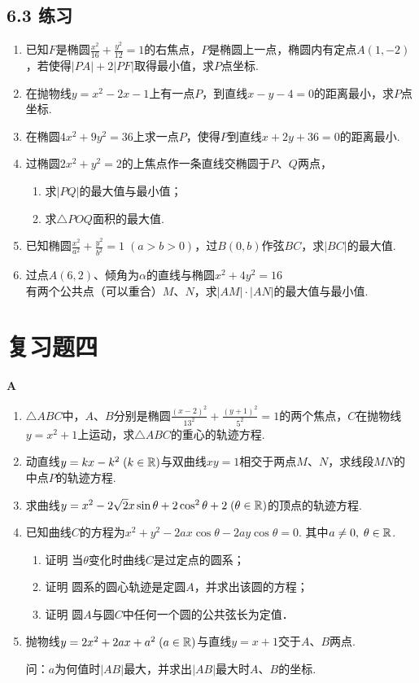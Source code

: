 \subsection*{6.3 练习}
\begin{enumerate}
\item 已知$F$是椭圆$\frac{x^2}{16}+\frac{y^2}{12}=1$的右焦点，$P$是椭圆上一点，椭圆内有定点$A(1,-2)$，若使得$|PA|+2|PF|$取得最小值，求$P$点坐标.
\item 在抛物线$y=x^2-2x-1$上有一点$P$，到直线$x-y-4=0$的距离最小，求$P$点坐标.
\item 在椭圆$4x^2+9y^2=36$上求一点$P$，使得$P$到直线$x+2y+36=0$的距离最小.
\item 过椭圆$2x^2+y^2=2$的上焦点作一条直线交椭圆于$P$、$Q$两点，
\begin{enumerate}[(1)]
    \item 求$|PQ|$的最大值与最小值；
    \item 求$\triangle POQ$面积的最大值.
\end{enumerate}
\item 已知椭圆$\frac{x^2}{a^2}+\frac{y^2}{b^2}=1\; (a>b>0)$，过$B(0,b)$作弦$BC$，求$|BC|$的最大值.
\item 过点$A(6,2)$、倾角为$\alpha$的直线与椭圆$x^2+4y^2=16$有两个公共点（可以重合）$M$、$N$，求$|AM|\cdot |AN|$的最大值与最小值.
\end{enumerate}

\section*{复习题四}
\begin{center}
    \bfseries A
\end{center}

\begin{enumerate}
\item $\triangle ABC$中，$A$、$B$分别是椭圆$\frac{(x-2)^2}{13^2}+\frac{(y+1)^2}{5^2}=1$的两个焦点，$C$在抛物线$y=x^2+1$上运动，求$\triangle ABC$的重心的轨迹方程.
\item 动直线$y=kx-k^2\; (k\in\mathbb{R})$与双曲线$xy=1$相交于两点$M$、$N$，求线段$MN$的中点$P$的轨迹方程.
\item 求曲线$y=x^2-2\sqrt{2}x\sin\theta+2\cos^2\theta+2\; (\theta\in\mathbb{R})$的顶点的轨迹方程.
\item 已知曲线$C$的方程为$x^2+y^2-2ax\cos\theta-2ay\cos\theta=0$. 其中$a\ne 0,\; \theta\in\mathbb{R}$.
\begin{enumerate}[(1)]
\item 证明 当$\theta$变化时曲线$C$是过定点的圆系；
\item 证明 圆系的圆心轨迹是定圆$A$，并求出该圆的方程；
\item 证明 圆$A$与圆$C$中任何一个圆的公共弦长为定值．
\end{enumerate}

\item 抛物线$y=2x^2+2ax+a^2\; (a\in\mathbb{R})$与直线$y=x+1$交于$A$、$B$两点. 

问：$a$为何值时$|AB|$最大，并求出$|AB|$最大时$A$、$B$的坐标.
\end{enumerate}

